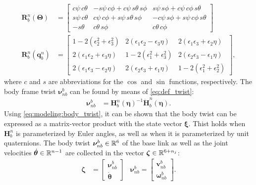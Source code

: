 \begin{subequations}
\begin{align}
    \bm{R}_b^n(\bm{\Theta}) &= \begin{bmatrix}
        c\psi\, c\theta & -s\psi\, c\phi + c\psi\, s\theta\, s\phi & s\psi\, s\phi + c\psi\, c\phi\, s\theta \\
        s\psi\, c\theta & c\psi\, c\phi + s\psi\, s\theta\, s\phi & -c\psi\,s\phi + s\psi\, c\phi\, s\theta \\
        -s\theta & c\theta\, s\phi & c\theta\, c\phi
    \end{bmatrix} \\
    \bm{R}_b^n(\bm{q}_b^n) &= \begin{bmatrix}
        1 - 2(\epsilon_2^2 + \epsilon_3^2) & 2(\epsilon_1\epsilon_2 - \epsilon_3\eta) & 2(\epsilon_1\epsilon_3 + \epsilon_2\eta) \\
        2(\epsilon_1\epsilon_2 + \epsilon_3\eta) & 1 - 2(\epsilon_1^2 + \epsilon_3^2) & 2(\epsilon_2\epsilon_3 - \epsilon_1\eta) \\
        2(\epsilon_1\epsilon_3 - \epsilon_2\eta) & 2(\epsilon_2\epsilon_3 + \epsilon_1\eta) & 1 - 2(\epsilon_1^2 + \epsilon_2^2)
    \end{bmatrix},
\end{align}
\end{subequations}
where $c$ and $s$ are abbreviations for the $\cos$ and $\sin$ functions, respectively. The body
frame twist $\bm{\nu}_{nb}^b$ can be found by means of \autoref{eq:def_twist}:
\begin{align}
    \label{eq:modeling:body_twist}
    \bm{\nu}_{nb}^b &= \bm{H}_b^n(\bm{\eta})^{-1} \dot{\bm{H}}_b^n(\bm{\eta}).
\end{align}
Using \autoref{eq:modeling:body_twist}, it can be shown that the body twist can be expressed
as a matrix-vector product with the state vector $\bm{\xi}$. Thist holds when $\bm{H}_b^n$ is parameterized by Euler angles,
as well as when it is parameterized by unit quaternions. The body twist
$\bm{\nu}_{nb}^b \in \mathbb{R}^6$ of the base link as well as the joint velocities
$\dot{\bm{\theta}} \in \mathbb{R}^{n-1}$ are collected in the vector $\bm{\zeta} \in \mathbb{R}^{6+n_j}$:
\begin{align}
    \bm{\zeta} &= \begin{bmatrix}\bm{\nu}_{nb}^b \\ \dot{\bm{\theta}}\end{bmatrix} &
        \bm{\nu}_{nb}^b = \begin{bmatrix} \bm{v}_{nb}^b \\ \bm{\omega}_{nb}^b\end{bmatrix}. 
\end{align}
